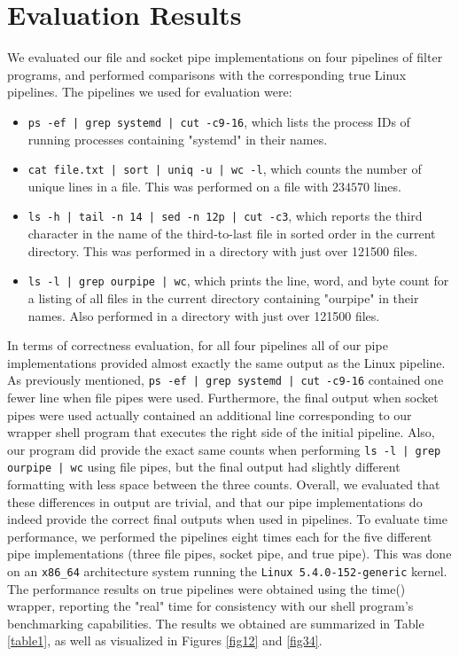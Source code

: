 \section{Evaluation Results}

We evaluated our file and socket pipe implementations on four pipelines of filter programs, and performed comparisons with the corresponding true Linux pipelines. The pipelines we used for evaluation were:
\begin{itemize}
  \item \texttt{ps -ef | grep systemd | cut -c9-16}, which lists the process IDs of running processes containing "systemd" in their names.
  \item \texttt{cat file.txt | sort | uniq -u | wc -l}, which counts the number of unique lines in a file. This was performed on a file with $234570$ lines.
  \item \texttt{ls -h |  tail -n 14 | sed -n 12p | cut -c3}, which reports the third character in the name of the third-to-last file in sorted order in the current directory. This was performed in a directory with just over 121500 files.
  \item \texttt{ls -l | grep ourpipe | wc}, which prints the line, word, and byte count for a listing of all files in the current directory containing "ourpipe" in their names. Also performed in a directory with just over 121500 files.
\end{itemize}

In terms of correctness evaluation, for all four pipelines all of our pipe implementations provided almost exactly the same output as the Linux pipeline. As previously mentioned, \texttt{ps -ef | grep systemd | cut -c9-16} contained one fewer line when file pipes were used. Furthermore, the final output when socket pipes were used actually contained an additional line corresponding to our wrapper shell program that executes the right side of the initial pipeline. Also, our program did provide the exact same counts when performing \texttt{ls -l | grep ourpipe | wc} using file pipes, but the final output had slightly different formatting with less space between the three counts. Overall, we evaluated that these differences in output are trivial, and that our pipe implementations do indeed provide the correct final outputs when used in pipelines. To evaluate time performance, we performed the pipelines eight times each for the five different pipe implementations (three file pipes, socket pipe, and true pipe). This was done on an \texttt{x86\_64} architecture system running the \texttt{Linux 5.4.0-152-generic} kernel. The performance results on true pipelines were obtained using the time() wrapper, reporting the "real" time for consistency with our shell program's benchmarking capabilities. The results we obtained are summarized in Table \ref{table1}, as well as visualized in Figures \ref{fig12} and \ref{fig34}.

